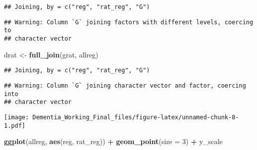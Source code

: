 \documentclass[]{article}
\newenvironment{Shaded}{\begin{snugshade}}{\end{snugshade}}
\newcommand{\DataTypeTok}[1]{\textcolor[rgb]{0.13,0.29,0.53}{#1}}
\newcommand{\DecValTok}[1]{\textcolor[rgb]{0.00,0.00,0.81}{#1}}
\newcommand{\KeywordTok}[1]{\textcolor[rgb]{0.13,0.29,0.53}{\textbf{#1}}}
\newcommand{\NormalTok}[1]{#1}
\newcommand{\OperatorTok}[1]{\textcolor[rgb]{0.81,0.36,0.00}{\textbf{#1}}}
\newcommand{\StringTok}[1]{\textcolor[rgb]{0.31,0.60,0.02}{#1}}
\begin{document}
\begin{verbatim}
## Joining, by = c("reg", "rat_reg", "G")
\end{verbatim}

\begin{verbatim}
## Warning: Column `G` joining factors with different levels, coercing to
## character vector
\end{verbatim}

\begin{Shaded}
\begin{Highlighting}[]
\NormalTok{drat <-}\StringTok{ }\KeywordTok{full_join}\NormalTok{(grat, allreg)}
\end{Highlighting}
\end{Shaded}

\begin{verbatim}
## Joining, by = c("reg", "rat_reg", "G")
\end{verbatim}

\begin{verbatim}
## Warning: Column `G` joining character vector and factor, coercing into
## character vector
\end{verbatim}

\begin{Shaded}
\end{Shaded}

\texttt{[image: Dementia\_Working\_Final\_files/figure-latex/unnamed-chunk-8-1.pdf]}

\begin{Shaded}
\begin{Highlighting}[]
\KeywordTok{ggplot}\NormalTok{(allreg, }\KeywordTok{aes}\NormalTok{(reg, rat_reg)) }\OperatorTok{+}\StringTok{ }
\StringTok{  }\KeywordTok{geom_point}\NormalTok{(}\DataTypeTok{size =} \DecValTok{3}\NormalTok{) }\OperatorTok{+}\StringTok{ }\NormalTok{y_scale}
\end{Highlighting}
\end{Shaded}
\end{document}
